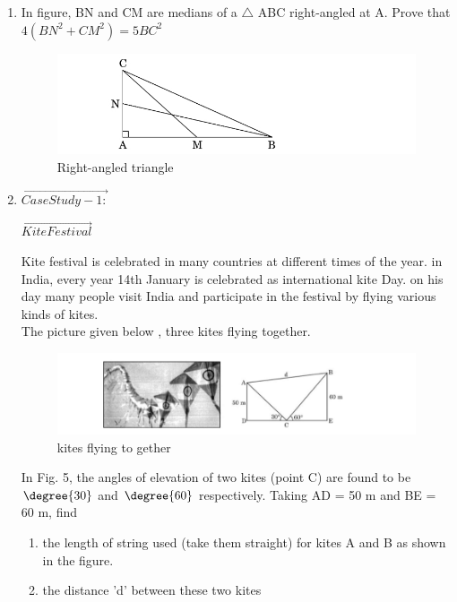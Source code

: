 \begin{enumerate}
\item In figure,  BN and CM are medians of a $\triangle$ ABC right-angled at A. Prove that $4(BN^2 +CM^2) = 5BC^2$ 
\begin{figure}[!ht]
\centering
\includegraphics[width=\columnwidth]{figs/rightangled}
\caption{Right-angled triangle}
\label{fig:rightangled4}
\end{figure}
\item $\vec{Case Study - 1:}$
\begin{center}
$\vec{Kite Festival}$\\
\end{center}
Kite festival is celebrated in many countries at different times of the year. in India, every year 14th
January is celebrated as international kite Day. on his day many people visit India and participate in the festival by flying various kinds of kites.
\\The picture given below  , three kites flying together.
\begin{figure}[!ht]
\centering
\includegraphics[width=\columnwidth]{figs/kites}
\caption{kites flying to gether}
\label{fig:kites5}
\end{figure}
In Fig. 5, the angles of elevation of two kites (point C) are found to be $\degree{30}$ and  $\degree{60}$ respectively. Taking AD = 50 m and BE = 60 m, find 
\begin{enumerate}
\item the length of string used (take them straight) for kites A and B as shown in the figure.
\item the distance 'd' between these two kites
\end{enumerate}
\end{enumerate}
	
